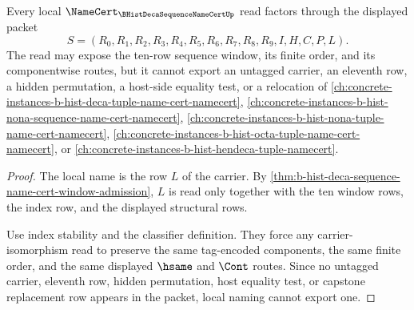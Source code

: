 \begin{theorem}
\label{thm:b-hist-deca-sequence-name-cert-local-naming-nonescape}
Every local $\NameCert_{\BHistDecaSequenceNameCertUp}$ read factors through the displayed packet
$$
S=(R_0,R_1,R_2,R_3,R_4,R_5,R_6,R_7,R_8,R_9,I,H,C,P,L).
$$
The read may expose the ten-row sequence window, its finite order, and its componentwise routes, but it cannot export an untagged carrier, an eleventh row, a hidden permutation, a host-side equality test, or a relocation of \autoref{ch:concrete-instances-b-hist-deca-tuple-name-cert-namecert}, \autoref{ch:concrete-instances-b-hist-nona-sequence-name-cert-namecert}, \autoref{ch:concrete-instances-b-hist-nona-tuple-name-cert-namecert}, \autoref{ch:concrete-instances-b-hist-octa-tuple-name-cert-namecert}, or \autoref{ch:concrete-instances-b-hist-hendeca-tuple-namecert}.
\end{theorem}
\begin{proof}
The local name is the row $L$ of the carrier. By \autoref{thm:b-hist-deca-sequence-name-cert-window-admission}, $L$ is read only together with the ten window rows, the index row, and the displayed structural rows.

Use index stability and the classifier definition. They force any carrier-isomorphism read to preserve the same tag-encoded components, the same finite order, and the same displayed $\hsame$ and $\Cont$ routes. Since no untagged carrier, eleventh row, hidden permutation, host equality test, or capstone replacement row appears in the packet, local naming cannot export one.
\end{proof}

